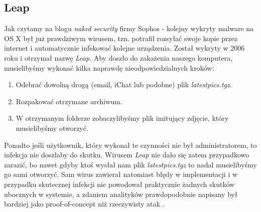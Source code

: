 \documentclass[polish]{kbk}
\begin{document}
\subsection{Leap \cite{history}}
Jak czytamy na blogu \textit{naked security} firmy Sophos - kolejny wykryty malware na OS X był już prawdziwym wirusem, tzn. potrafił rozsyłać swoje kopie przez internet i automatycznie infekować kolejne urządzenia. Został wykryty w 2006 roku i otrzymał nazwę \textit{Leap}. Aby doszło do zakażenia naszego komputera, musielibyśmy wykonać kilka naprawdę nieodpowiedzialnych kroków:
\begin{enumerate}
\item Odebrać dowolną drogą (email, iChat lub podobne) plik \textit{latestpics.tgz}.
\item Rozpakować otrzymane archiwum.
\item W otrzymanym folderze zobaczylibyśmy plik imitujący zdjęcie, który musielibyśmy otworzyć.
\end{enumerate}
Ponadto jeśli użytkownik, który wykonał te czynności nie był administratorem, to infekcja nie doszłaby do skutku. Wirusem \textit{Leap} nie dało się zatem przypadkowo zarazić, bo nawet gdyby ktoś wysłał nam plik \textit{latestpics.tgz} to nadal musielibyśmy go sami otworzyć. Sam wirus zawierał natomiast błędy w implementacji i w przypadku skutecznej infekcji nie powodował praktycznie żadnych skutków ubocznych w systemie, a zdaniem analityków prawdopodobnie napisany był bardziej jako proof-of-concept niż rzeczywisty atak \cite{ambrosio}.
\end{document}
